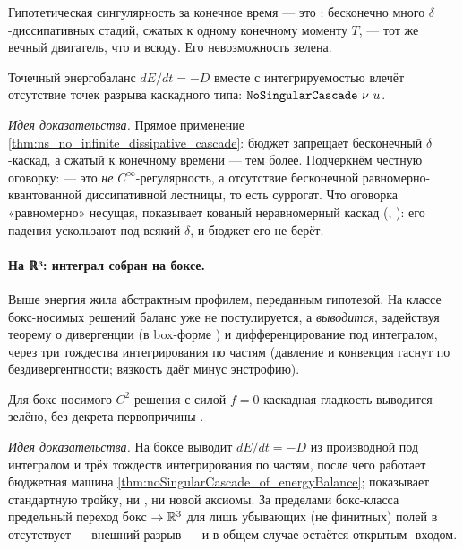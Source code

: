 Гипотетическая сингулярность за конечное время --- это : бесконечно много
$\delta$-диссипативных стадий, сжатых к одному конечному моменту $T$, --- тот же вечный двигатель,
что и всюду. Его невозможность зелена.

\begin{theorem}\label{thm:noSingularCascade_of_energyBalance}
Точечный энергобаланс $dE/dt = -D$ вместе с интегрируемостью влечёт отсутствие точек разрыва
каскадного типа: $\code{NoSingularCascade}\ \nu\ u$. \green{}
\end{theorem}

\emph{Идея доказательства.} Прямое применение \cref{thm:ns_no_infinite_dissipative_cascade}: бюджет
запрещает бесконечный $\delta$-каскад, а сжатый к конечному времени --- тем более. Подчеркнём
честную оговорку:  --- это \emph{не} $C^\infty$-регулярность, а отсутствие
бесконечной равномерно-квантованной диссипативной лестницы, то есть суррогат. Что оговорка
«равномерно» несущая, показывает кованый неравномерный каскад
(, \green{}): его падения ускользают под всякий $\delta$, и
бюджет его не берёт.

\paragraph{На ℝ³: интеграл собран на боксе.}
Выше энергия жила абстрактным профилем, переданным гипотезой. На классе бокс-носимых решений баланс
уже не постулируется, а \emph{выводится}, задействуя теорему  о дивергенции (в
box-форме ) и дифференцирование под
интегралом, через три тождества интегрирования по частям (давление и конвекция гаснут по
бездивергентности; вязкость даёт минус энстрофию).

\begin{theorem}\label{thm:noSingularCascade_of_r3Assembly}
Для бокс-носимого $C^2$-решения с силой $f = 0$ каскадная гладкость 
выводится зелёно, без декрета первопричины . \green{}
\end{theorem}

\emph{Идея доказательства.} На боксе  выводит $dE/dt = -D$ из
производной под интегралом и трёх тождеств интегрирования по частям, после чего работает бюджетная
машина \cref{thm:noSingularCascade_of_energyBalance};  показывает стандартную
тройку, ни , ни новой аксиомы. За пределами бокс-класса предельный переход
бокс $\to \mathbb{R}^3$ для лишь убывающих (не финитных) полей в  отсутствует --- внешний
разрыв --- и  в общем случае остаётся открытым \red{}-входом.


